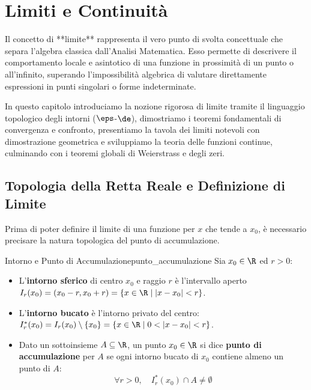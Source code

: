\chapter{Limiti e Continuità}
\label{chap:limiti_continuita}

Il concetto di **limite** rappresenta il vero punto di svolta concettuale che separa l'algebra classica dall'Analisi Matematica. Esso permette di descrivere il comportamento locale e asintotico di una funzione in prossimità di un punto o all'infinito, superando l'impossibilità algebrica di valutare direttamente espressioni in punti singolari o forme indeterminate.

In questo capitolo introduciamo la nozione rigorosa di limite tramite il linguaggio topologico degli intorni ($\eps$-$\de$), dimostriamo i teoremi fondamentali di convergenza e confronto, presentiamo la tavola dei limiti notevoli con dimostrazione geometrica e sviluppiamo la teoria delle funzioni continue, culminando con i teoremi globali di Weierstrass e degli zeri.

\section{Topologia della Retta Reale e Definizione di Limite}
\label{sec:definizione_limite_dettagliata}

Prima di poter definire il limite di una funzione per $x$ che tende a $x_0$, è necessario precisare la natura topologica del punto di accumulazione.

\begin{definizione}{Intorno e Punto di Accumulazione}{punto_accumulazione}
Sia $x_0 \in \R$ ed $r > 0$:
\begin{itemize}
    \item L'\textbf{intorno sferico} di centro $x_0$ e raggio $r$ è l'intervallo aperto $I_r(x_0) = (x_0 - r, x_0 + r) = \{x \in \R \mid |x - x_0| < r\}$.
    \item L'\textbf{intorno bucato} è l'intorno privato del centro: $I^*_r(x_0) = I_r(x_0) \setminus \{x_0\} = \{x \in \R \mid 0 < |x - x_0| < r\}$.
    \item Dato un sottoinsieme $A \subseteq \R$, un punto $x_0 \in \R$ si dice \textbf{punto di accumulazione} per $A$ se ogni intorno bucato di $x_0$ contiene almeno un punto di $A$:
    \[
        \forall r > 0, \quad I^*_r(x_0) \cap A \neq \emptyset
    \]
\end{itemize}
\end{definizione}

